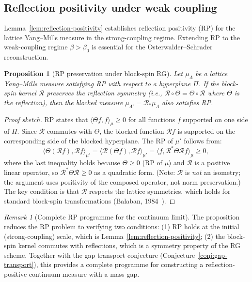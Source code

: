 \documentclass[12pt,a4paper]{article}
\theoremstyle{definition}
\theoremstyle{plain}
\newtheorem{proposition}[definition]{Proposition}
\theoremstyle{remark}
\newtheorem{remark}[definition]{Remark}
\begin{document}
\subsection{Reflection positivity under weak coupling}
\label{sec:rp-weak}

Lemma~\ref{lem:reflection-positivity} establishes reflection positivity (RP) for the lattice Yang--Mills measure in the strong-coupling regime. Extending RP to the weak-coupling regime $\beta > \beta_0$ is essential for the Osterwalder--Schrader reconstruction.

\begin{proposition}[RP preservation under block-spin RG]
\label{prop:rp-preservation}
Let $\mu_\Lambda$ be a lattice Yang--Mills measure satisfying RP with respect to a hyperplane $\Pi$. If the block-spin kernel $\mathcal{R}$ preserves the reflection symmetry (i.e., $\mathcal{R} \circ \Theta = \Theta \circ \mathcal{R}$ where $\Theta$ is the reflection), then the blocked measure $\mu_{\Lambda'} = \mathcal{R}_* \mu_\Lambda$ also satisfies RP.
\end{proposition}

\begin{proof}[Proof sketch]
RP states that $\langle \Theta f, f \rangle_{\mu} \geq 0$ for all functions $f$ supported on one side of $\Pi$. Since $\mathcal{R}$ commutes with $\Theta$, the blocked function $\mathcal{R} f$ is supported on the corresponding side of the blocked hyperplane. The RP of $\mu'$ follows from:
\[
\langle \Theta(\mathcal{R} f), \mathcal{R} f \rangle_{\mu'} = \langle \mathcal{R}(\Theta f), \mathcal{R} f \rangle_{\mu'} = \langle f, \mathcal{R}^* \Theta \mathcal{R} f \rangle_{\mu} \geq 0,
\]
where the last inequality holds because $\Theta \geq 0$ (RP of $\mu$) and $\mathcal{R}$ is a positive linear operator, so $\mathcal{R}^* \Theta \mathcal{R} \geq 0$ as a quadratic form. (Note: $\mathcal{R}$ is \emph{not} an isometry; the argument uses positivity of the composed operator, not norm preservation.) The key condition is that $\mathcal{R}$ respects the lattice symmetries, which holds for standard block-spin transformations (Balaban, 1984~\cite{Balaban1985b}).
\end{proof}

\begin{remark}[Complete RP programme for the continuum limit]
The proposition reduces the RP problem to verifying two conditions: (1) RP holds at the initial (strong-coupling) scale, which is Lemma~\ref{lem:reflection-positivity}; (2) the block-spin kernel commutes with reflections, which is a symmetry property of the RG scheme. Together with the gap transport conjecture (Conjecture~\ref{conj:gap-transport}), this provides a complete programme for constructing a reflection-positive continuum measure with a mass gap.
\end{remark}
\end{document}
